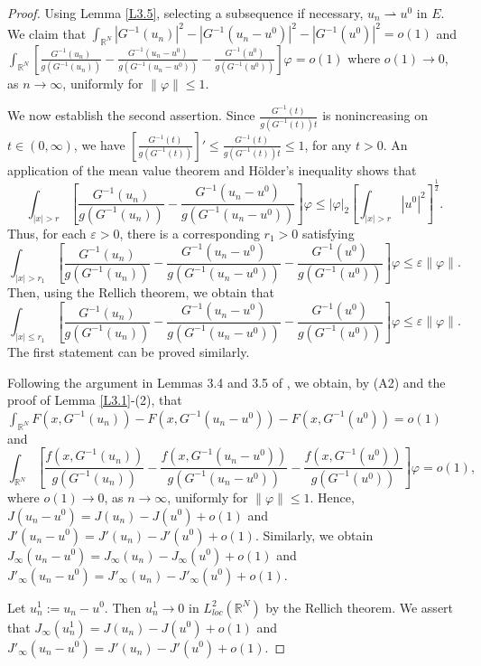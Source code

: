 \documentclass[reqno]{amsart}
\begin{document}
\begin{proof}  
Using Lemma \ref{L3.5},  selecting a subsequence if necessary,  $u_n\rightharpoonup u^0$ in $E$. 
 We claim that $\int_{\mathbb{R}^N}|G^{-1}(u_n)|^2-|G^{-1}(u_n-u^0)|^2-|G^{-1}(u^0)|^2=o(1)$ and 
 $\int_{\mathbb{R}^N}[\frac{G^{-1}(u_n)}{g(G^{-1}(u_n))}-\frac{G^{-1}(u_n-u^0)}{g(G^{-1}(u_n-u^0))}
 -\frac{G^{-1}(u^0)}{g(G^{-1}(u^0))}]\varphi=o(1)$ where $o(1)\to0$, as $n\to\infty$, 
 uniformly for $\|\varphi\|\leq1$.

We now establish the second assertion. Since $\frac{G^{-1}(t)}{g(G^{-1}(t))t}$ is nonincreasing 
on $t\in(0,\infty)$, we have $[\frac{G^{-1}(t)}{g(G^{-1}(t))}]'\leq \frac{G^{-1}(t)}{g(G^{-1}(t))t}\leq1$, 
for any $t>0$. An application of the mean value theorem and H\"older's inequality shows that 
$$
\int_{|x|>r}[\frac{G^{-1}(u_n)}{g(G^{-1}(u_n))}-\frac{G^{-1}(u_n-u^0)}{g(G^{-1}(u_n-u^0))}]
\varphi\leq|\varphi|_{2}[\int_{|x|>r}|u^0|^2]^\frac{1}{2}.
$$ 
Thus, for each $\varepsilon > 0$, there is a corresponding $r_1 > 0$ satisfying 
$$
\int_{|x|>r_1}[\frac{G^{-1}(u_n)}{g(G^{-1}(u_n))}-\frac{G^{-1}(u_n-u^0)}{g(G^{-1}(u_n-u^0))}-\frac{G^{-1}(u^0)}{g(G^{-1}(u^0))}]\varphi\leq\varepsilon\|\varphi\|.
$$  
Then, using the Rellich theorem, we obtain that 
$$
\int_{|x|\leq r_1}[\frac{G^{-1}(u_n)}{g(G^{-1}(u_n))}-\frac{G^{-1}(u_n-u^0)}{g(G^{-1}(u_n-u^0))}-\frac{G^{-1}(u^0)}{g(G^{-1}(u^0))}]\varphi\leq\varepsilon\|\varphi\|.
$$  
The first statement can be proved similarly.

Following the argument in  Lemmas 3.4 and 3.5 of \cite{Yang}, we obtain, by (A2) and the 
proof of Lemma \ref{L3.1}-(2),  that
$\int_{\mathbb{R}^N}F(x,G^{-1}(u_n))-F(x,G^{-1}(u_n-u^0))-F(x,G^{-1}(u^0))=o(1)$ and
\[
\int_{\mathbb{R}^N}[\frac{f(x,G^{-1}(u_n))}{g(G^{-1}(u_n))}
-\frac{f(x,G^{-1}(u_n-u^0))}{g(G^{-1}(u_n-u^0))}-\frac{f(x,G^{-1}(u^0))}{g(G^{-1}(u^0))}]\varphi=o(1), 
\]
where $o(1)\to0$, as $n\to\infty$, uniformly for $\|\varphi\|\leq1$. 
Hence, $J(u_n-u^0)=J(u_n)-J(u^0)+o(1)$ and $J'(u_n-u^0)=J'(u_n)-J'(u^0)+o(1)$. 
Similarly, we obtain $J_\infty(u_n-u^0)=J_\infty(u_n)-J_\infty(u^0)+o(1)$  and 
$J'_\infty(u_n-u^0)=J'_\infty(u_n)-J'_\infty(u^0)+o(1)$. 
 
Let $u^1_n:=u_n-u^0$. Then $u^1_n\to 0$ in $L^2_{loc}({\mathbb{R}^N})$ by the Rellich theorem. 
We assert that  $J_\infty(u^1_n)=J(u_n)-J(u^0)+o(1)$ and $J'_\infty(u_n-u^0)=J'(u_n)-J'(u^0)+o(1)$.


\end{proof}
\end{document}
